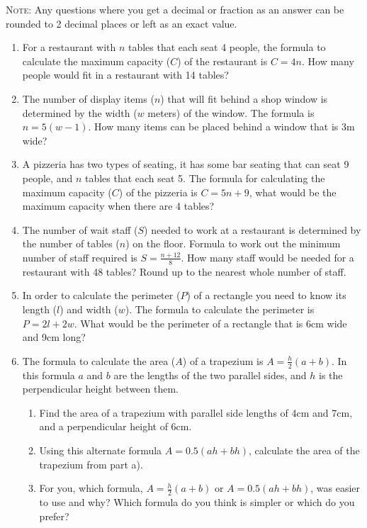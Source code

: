 \documentclass[a4paper,12pt]{article}
\begin{document}
\textsc{Note}: Any questions where you get a decimal or fraction 
as an answer can be rounded to 2 decimal places or left as 
an exact value.

\begin{enumerate}

\item For a restaurant with $n$ tables that each seat 4 people,
    the formula to calculate the maximum capacity ($C$) of the 
    restaurant is $C = 4n$. How many people would fit in a
    restaurant with 14 tables?

\item The number of display items ($n$) that will fit 
    behind a shop window is determined by the width ($w$ meters) 
    of the window. The formula is $n = 5(w - 1)$. How many items 
    can be placed behind a window that is 3m wide?

\item A pizzeria has two types of seating, it has some bar 
    seating that can seat 9 people, and $n$ tables that 
    each seat 5. The formula for calculating the maximum 
    capacity ($C$) of the pizzeria is $C = 5n + 9$, what
    would be the maximum capacity when there are 4 tables?

\item The number of wait staff ($S$) needed to work at a restaurant is 
    determined by the number of tables ($n$) on the floor. Formula 
    to work out the minimum number of staff required is 
    $S = \frac{n + 12}{8}$. How many staff would be needed for a 
    restaurant with 48 tables? Round up to the nearest whole number 
    of staff.

\item In order to calculate the perimeter ($P$) of a rectangle 
    you need to know its length ($l$) and width ($w$). The formula
    to calculate the perimeter is $P = 2l + 2w$. What would be
    the perimeter of a rectangle that is 6cm wide and 9cm long?

\item The formula to calculate the area ($A$) of a trapezium is
    $A = \frac{h}{2}(a + b)$. In this formula $a$ and 
    $b$ are the lengths of the two parallel sides, and $h$ is the 
    perpendicular height between them.
    \begin{enumerate}
    \item Find the area of a trapezium with parallel side lengths 
        of 4cm and 7cm, and a perpendicular height of 6cm.
    \item Using this alternate formula 
        $A = 0.5(ah + bh)$, calculate the 
        area of the trapezium from part a).
    \item For you, which formula, $A = \frac{h}{2}(a + b)$
        or $A = 0.5(ah + bh)$, was easier to use and why? Which 
        formula do you think is simpler or which do you prefer?
    \end{enumerate}


\end{enumerate}
\end{document}
